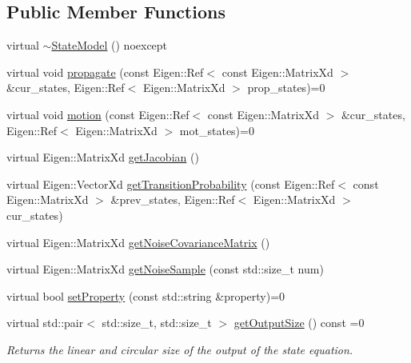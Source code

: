 \subsection*{Public Member Functions}
\begin{DoxyCompactItemize}
\item 
virtual \mbox{\hyperlink{classbfl_1_1StateModel_ae07722f42306f297da2e55ce8cb0214a}{$\sim$\+State\+Model}} () noexcept
\item 
virtual void \mbox{\hyperlink{classbfl_1_1StateModel_a39cd8c8c5adbd623884583b4a7a7415c}{propagate}} (const Eigen\+::\+Ref$<$ const Eigen\+::\+Matrix\+Xd $>$ \&cur\+\_\+states, Eigen\+::\+Ref$<$ Eigen\+::\+Matrix\+Xd $>$ prop\+\_\+states)=0
\item 
virtual void \mbox{\hyperlink{classbfl_1_1StateModel_a34037bc30bc07667b76b5a719a65ab82}{motion}} (const Eigen\+::\+Ref$<$ const Eigen\+::\+Matrix\+Xd $>$ \&cur\+\_\+states, Eigen\+::\+Ref$<$ Eigen\+::\+Matrix\+Xd $>$ mot\+\_\+states)=0
\item 
virtual Eigen\+::\+Matrix\+Xd \mbox{\hyperlink{classbfl_1_1StateModel_a78df4b39578345142fcfb18abaab2177}{get\+Jacobian}} ()
\item 
virtual Eigen\+::\+Vector\+Xd \mbox{\hyperlink{classbfl_1_1StateModel_acb582cb7d41ec7b854ed1dbd8965b6fc}{get\+Transition\+Probability}} (const Eigen\+::\+Ref$<$ const Eigen\+::\+Matrix\+Xd $>$ \&prev\+\_\+states, Eigen\+::\+Ref$<$ Eigen\+::\+Matrix\+Xd $>$ cur\+\_\+states)
\item 
virtual Eigen\+::\+Matrix\+Xd \mbox{\hyperlink{classbfl_1_1StateModel_a423c1fa86b9d60c8663dedc6cdcae276}{get\+Noise\+Covariance\+Matrix}} ()
\item 
virtual Eigen\+::\+Matrix\+Xd \mbox{\hyperlink{classbfl_1_1StateModel_acc6733af2dcba2a330bf7c59c3725e42}{get\+Noise\+Sample}} (const std\+::size\+\_\+t num)
\item 
virtual bool \mbox{\hyperlink{classbfl_1_1StateModel_ac86dcdad8f0bbfab39a23e592779feaa}{set\+Property}} (const std\+::string \&property)=0
\item 
virtual std\+::pair$<$ std\+::size\+\_\+t, std\+::size\+\_\+t $>$ \mbox{\hyperlink{classbfl_1_1StateModel_a6bf680b689389d959fc9ac46595e6dab}{get\+Output\+Size}} () const =0
\begin{DoxyCompactList}\small\item\em Returns the linear and circular size of the output of the state equation. \end{DoxyCompactList}\end{DoxyCompactItemize}


